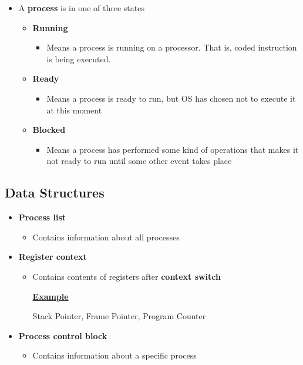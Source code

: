 \documentclass[12pt]{article}
\begin{document}
\begin{itemize}
    \item A \textbf{process} is in one of three states
    \begin{itemize}
        \item \textbf{Running}
        \begin{itemize}
            \item Means a process is running on a processor. That is, coded instruction
            is being executed.
        \end{itemize}
        \item \textbf{Ready}
        \begin{itemize}
            \item Means a process is ready to run, but OS has chosen not to execute it
            at this moment
        \end{itemize}
        \item \textbf{Blocked}
        \begin{itemize}
            \item Means a process has performed some kind of operations that makes it
            not ready to run until some other event takes place
        \end{itemize}
    \end{itemize}
\end{itemize}

\subsection{Data Structures}

\begin{itemize}
    \item \textbf{Process list}
    \begin{itemize}
        \item Contains information about all processes
    \end{itemize}
    \item \textbf{Register context}
    \begin{itemize}
        \item Contains contents of registers after \textbf{context switch}

        \bigskip

        \underline{\textbf{Example}}

        \bigskip

        Stack Pointer, Frame Pointer, Program Counter
    \end{itemize}
    \item \textbf{Process control block}
    \begin{itemize}
        \item Contains information about a specific process
    \end{itemize}
\end{itemize}
\end{document}
